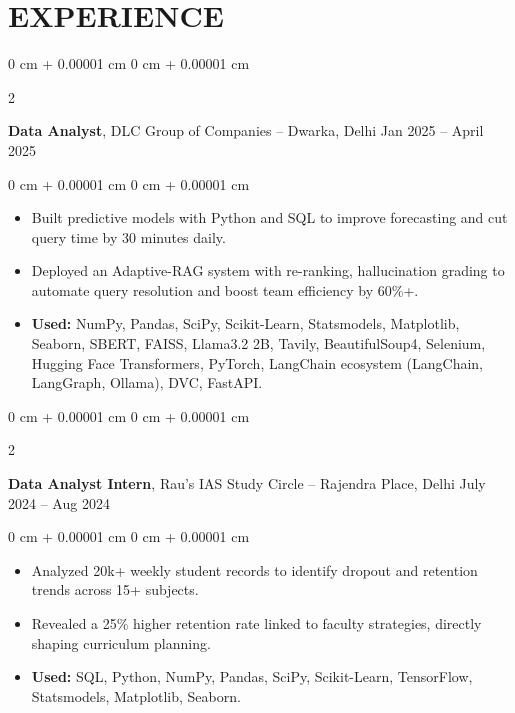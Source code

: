 \documentclass[10pt, letterpaper]{article}
\newenvironment{highlights}{
    \begin{itemize}[
        topsep=0.10 cm,
        parsep=0.10 cm,
        partopsep=0pt,
        itemsep=0pt,
        leftmargin=0 cm + 10pt
    ]
}{
    \end{itemize}
} %
\newenvironment{onecolentry}{
    \begin{adjustwidth}{
        0 cm + 0.00001 cm
    }{
        0 cm + 0.00001 cm
    }
}{
    \end{adjustwidth}
} %
\newenvironment{twocolentry}[2][]{
    \onecolentry
    \def\secondColumn{#2}
    \setcolumnwidth{\fill, 4 cm}
    \begin{paracol}{2}
}{
    \switchcolumn \raggedleft \secondColumn
    \end{paracol}
    \endonecolentry
} %
\begin{document}
    
    \section{EXPERIENCE}
        
        \begin{twocolentry}{
            Jan 2025 – April 2025
        }
            \textbf{Data Analyst}, DLC Group of Companies -- Dwarka, Delhi\end{twocolentry}

        \vspace{0.10 cm}
        \begin{onecolentry}
            \begin{highlights}
                \item Built predictive models with Python and SQL to improve forecasting and cut query time by 30 minutes daily.
                \item Deployed an Adaptive-RAG system with re-ranking, hallucination grading to automate query resolution and boost team efficiency by 60\%+.
                \item \textbf{Used:} NumPy, Pandas, SciPy, Scikit-Learn, Statsmodels, Matplotlib, Seaborn, SBERT, FAISS, Llama3.2 2B, Tavily, BeautifulSoup4, Selenium, Hugging Face Transformers, PyTorch, LangChain ecosystem (LangChain, LangGraph, Ollama), DVC, FastAPI.
            \end{highlights}
        \end{onecolentry}

        \vspace{0.2 cm}

        \begin{twocolentry}{
            July 2024 – Aug 2024
        }
            \textbf{Data Analyst Intern}, Rau's IAS Study Circle -- Rajendra Place, Delhi\end{twocolentry}

        \vspace{0.10 cm}
        \begin{onecolentry}
            \begin{highlights}
                \item Analyzed 20k+ weekly student records to identify dropout and retention trends across 15+ subjects.
                \item Revealed a 25\% higher retention rate linked to faculty strategies, directly shaping curriculum planning.
                \item \textbf{Used:} SQL, Python, NumPy, Pandas, SciPy, Scikit-Learn, TensorFlow, Statsmodels, Matplotlib, Seaborn.
            \end{highlights}
        \end{onecolentry}
\end{document}
